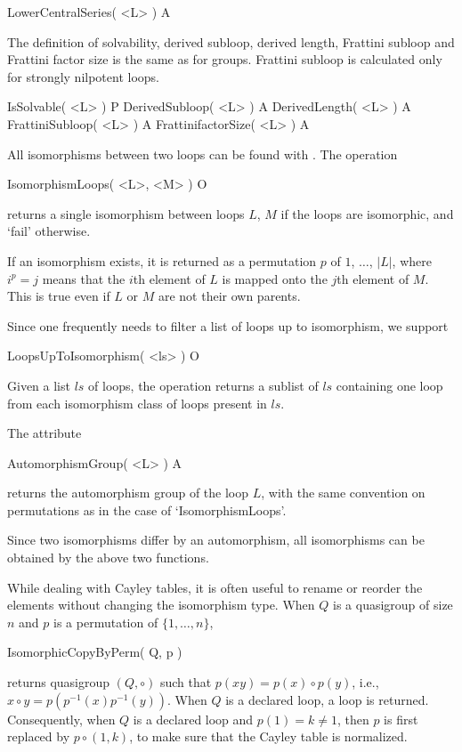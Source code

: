 \>LowerCentralSeries( <L> ) A


The definition of solvability, derived subloop, derived length, Frattini
subloop and Frattini factor size is the same as for groups. Frattini subloop is
calculated only for strongly nilpotent loops.

\>IsSolvable( <L> ) P
\>DerivedSubloop( <L> ) A
\>DerivedLength( <L> ) A
\>FrattiniSubloop( <L> ) A
\>FrattinifactorSize( <L> ) A


All isomorphisms between two loops can be found with {\LOOPS}. The operation

\>IsomorphismLoops( <L>, <M> ) O

returns a single isomorphism between loops $L$, $M$ if the loops are
isomorphic, and `fail' otherwise.

If an isomorphism exists, it is returned as a permutation $p$ of $1$, $\dots$,
$|L|$, where $i^p=j$ means that the $i$th element of $L$ is mapped onto the
$j$th element of $M$. This is true even if $L$ or $M$ are not their own
parents.

Since one frequently needs to filter a list of loops up to isomorphism, we
support

\>LoopsUpToIsomorphism( <ls> ) O

Given a list $ls$ of loops, the operation returns a sublist of $ls$ containing
one loop from each isomorphism class of loops present in $ls$.

The attribute

\>AutomorphismGroup( <L> ) A

returns the automorphism group of the loop $L$, with the same convention on
permutations as in the case of `IsomorphismLoops'.

Since two isomorphisms differ by an automorphism, all isomorphisms can be
obtained by the above two functions.

While dealing with Cayley tables, it is often useful to rename or reorder the
elements without changing the isomorphism type. When $Q$ is a quasigroup of
size $n$ and $p$ is a permutation of $\{1,\dots,n\}$,

\>IsomorphicCopyByPerm( Q, p )

returns quasigroup $(Q,\circ)$ such that $p(xy) = p(x)\circ p(y)$, i.e.,
$x\circ y = p( p^{-1}(x)p^{-1}(y))$. When $Q$ is a declared loop, a loop is
returned. Consequently, when $Q$ is a declared loop and $p(1) = k\ne 1$, then
$p$ is first replaced by $p\circ (1,k)$, to make sure that the Cayley table is
normalized.


